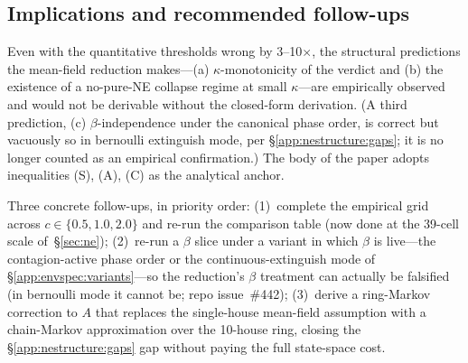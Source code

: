 \documentclass{anvil-paper}
\begin{document}
\subsection{Implications and recommended follow-ups}
\label{app:nestructure:followups}

Even with the quantitative thresholds wrong by 3--10$\times$, the
structural predictions the mean-field reduction makes---(a)
$\kappa$-monotonicity of the verdict and (b) the existence of a
no-pure-NE collapse regime at small $\kappa$---are empirically observed
and would not be derivable without the closed-form derivation. (A third
prediction, (c) $\beta$-independence under the canonical phase order, is
correct but vacuously so in bernoulli extinguish mode, per
\S\ref{app:nestructure:gaps}; it is no longer counted as an empirical
confirmation.) The body of the paper
adopts inequalities (S), (A), (C) as the analytical anchor.

Three concrete follow-ups, in priority order:
(1)~complete the empirical grid across $c\in\{0.5,1.0,2.0\}$ and
re-run the comparison table (now done at the 39-cell scale
of~\S\ref{sec:ne}); (2)~re-run a $\beta$ slice under a variant in which
$\beta$ is live---the contagion-active phase order or the
continuous-extinguish mode of \S\ref{app:envspec:variants}---so the
reduction's $\beta$ treatment can actually be falsified (in bernoulli
mode it cannot be; repo issue~\#442); (3)~derive a ring-Markov correction to
$A$ that replaces the single-house mean-field assumption with a
chain-Markov approximation over the 10-house ring, closing the
\S\ref{app:nestructure:gaps} gap without paying the full state-space
cost.
\end{document}
